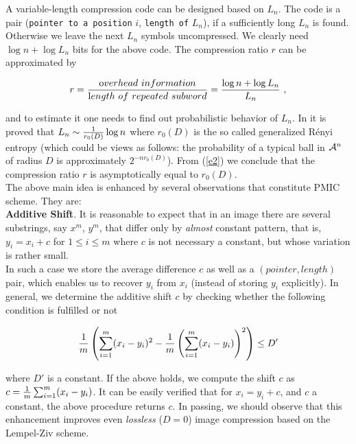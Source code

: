 \documentclass[11pt,a4paper]{article}
\newcommand{\A}{{\cal A}}
\begin{document}
A variable-length compression code can be designed based on $L_n$.  The
code is a pair ({\tt pointer to a position} $i$, {\tt length of} $L_n$), if
a sufficiently long $L_n$ is found. Otherwise we leave the next $L_n$
symbols uncompressed. We clearly need $\log n + \log L_n$ bits for the
above code.  The compression ratio $r$ can be approximated by

\begin{equation}
r={{\mathrm overhead~ information} \over {\mathrm
length ~of~repeated ~subword}}= {{\log n + \log L_n} \over L_n} ~,
\label{e2}
\end{equation}

and to estimate it one needs to find out probabilistic behavior of $L_n$.
In \cite{lus1,lus2} it is proved that $L_n \sim {1\over r_0(D)} \log n$
where $r_0(D)$ is the so called generalized R\'{e}nyi entropy (which could
be views as follows: the probability of a typical ball in $\A^n$ of radius
$D$ is approximately $2^{-n r_0(D)}$). From (\ref{e2}) we conclude that the
compression ratio $r$ is asymptotically equal to $r_0(D)$.\\

The above main idea is enhanced by several observations that constitute
PMIC scheme. They are:\\

{\bf Additive Shift}. It is reasonable to expect that in an image there are
several substrings, say $x^m$, $y^m$, that differ only by {\it almost}
constant pattern, that is, $y_i=x_i +c$ for $1\leq i \leq m$ where $c$ is
not necessary a constant, but whose variation is rather small.\\

In such a case we store the average difference $c$ as well as a
$(pointer,length)$ pair, which enables us to recover $y_i$ from $x_i$
(instead of storing $y_i$ explicitly).  In general, we determine the
additive shift $c$ by checking whether the following condition is fulfilled
or not

$$
{1\over m} \left(\sum_{i=1}^m (x_i-y_i)^2 -{1\over m} \left(\sum_{i=1}^m
(x_i-y_i)\right)^2 \right) \leq D'
$$

where $D'$ is a constant. If the above holds, we compute the shift $c$ as $
c={1\over m} \sum_{i=1}^m (x_i-y_i) $.  It can be easily verified that for
$x_i=y_i+c$, and $c$ a constant, the above procedure returns $c$. In
passing, we should observe that this enhancement improves even {\it
  lossless} ($D=0$) image compression based on the Lempel-Ziv scheme.\\
\end{document}

